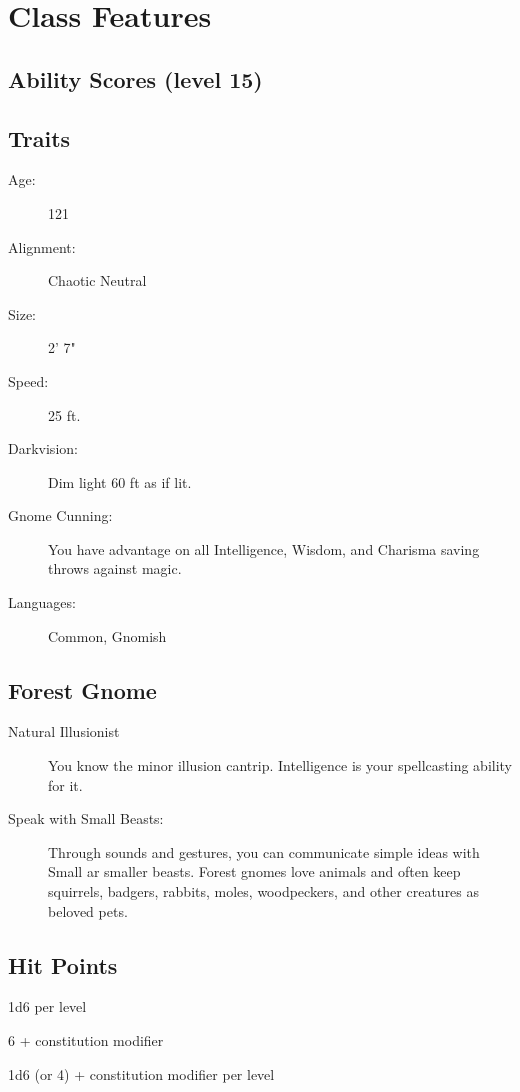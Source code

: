 \documentclass[letterpaper,10pt,twoside,twocolumn,openany]{book}
\begin{document}
\section{Class Features}

\subsection{Ability Scores (level 15)}
\stats[
STR = \stat{8},
DEX = \stat{12},
CON = \stat{18},
INT = \stat{16},
WIS = \stat{14},
CHA = \stat{20}
]

\subsection{Traits}
\begin{description}
	\item[Age:] 121
	\item[Alignment:] Chaotic Neutral
	\item[Size:] 2' 7"
	\item[Speed:] 25 ft.
	\item[Darkvision:] Dim light 60 ft as if lit.
	\item[Gnome Cunning:] You have advantage on all
	Intelligence, Wisdom, and Charisma saving throws
	against magic. 
	\item[Languages:] Common, Gnomish
\end{description}

\subsection{Forest Gnome}
\begin{description}
	\item[Natural Illusionist] You know the	minor illusion
	cantrip. Intelligence  is your spellcasting ability for it.
	\item[Speak with Small Beasts:] Through sounds and
	gestures, you can communicate simple ideas with Small
	ar smaller beasts. Forest gnomes love animals and often
	keep squirrels, badgers, rabbits, moles, woodpeckers,
	and other creatures as beloved pets.
\end{description}

\subsection{Hit Points}

\begin{description}[font=\normalfont\textbf,noitemsep,topsep=1ex,leftmargin=1em]
	\item[Hit Dice:] 1d6 per level
	\item[Hit Points at First Level:] 6 + constitution modifier
	\item[Hit Points at Higher levels:] 1d6 (or 4) + constitution modifier per level 
\end{description}
\end{document}
